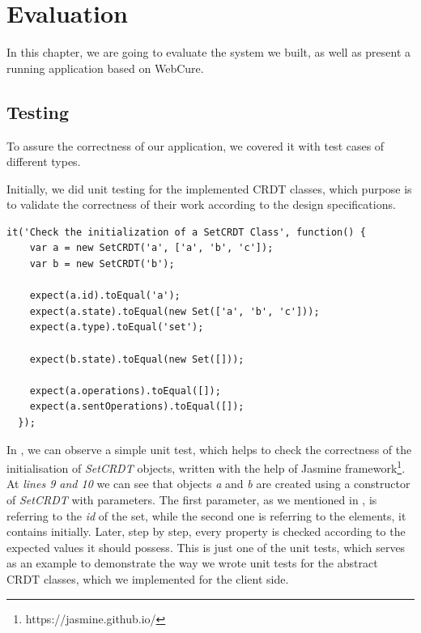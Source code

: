 \chapter{Evaluation}
\label{Evaluation}

In this chapter, we are going to evaluate the system we built, as well as present a running application based on WebCure. 

\section{Testing}

To assure the correctness of our application, we covered it with test cases of different types. 

Initially, we did unit testing for the implemented CRDT classes, which purpose is to validate the correctness of their work according to the design specifications. 

\begin{lstlisting}[caption={[Unit test example for the \textit{SetCRDT} class]Simple unit test that checks the correct initialization of objects of a \textit{SetCRDT} class.}, label={lst:ev1}]
  it('Check the initialization of a SetCRDT Class', function() {
    var a = new SetCRDT('a', ['a', 'b', 'c']);
    var b = new SetCRDT('b');

    expect(a.id).toEqual('a');
    expect(a.state).toEqual(new Set(['a', 'b', 'c']));
    expect(a.type).toEqual('set');
    
    expect(b.state).toEqual(new Set([]));

    expect(a.operations).toEqual([]);
    expect(a.sentOperations).toEqual([]);
  });
\end{lstlisting}

In , we can observe a simple unit test, which helps to check the correctness of the initialisation of \textit{SetCRDT} objects, written with the help of Jasmine framework\footnote{https://jasmine.github.io/}. At \textit{lines 9 and 10} we can see that objects \textit{a} and \textit{b} are created using a constructor of \textit{SetCRDT} with parameters. The first parameter, as we mentioned in , is referring to the \textit{id} of the set, while the second one is referring to the elements, it contains initially. Later, step by step, every property is checked according to the expected values it should possess. This is just one of the unit tests, which serves as an example to demonstrate the way we wrote unit tests for the abstract CRDT classes, which we implemented for the client side.

